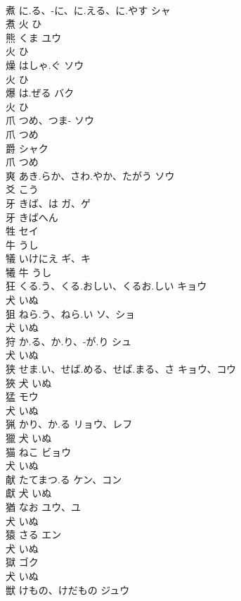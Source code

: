 \documentclass[8pt]{extreport}
\begin{document}
\begin{CJK}{UTF8}{min}
\\	煮	に.る、-に、に.える、に.やす	シャ	
\\	煮	火		ひ		
\\	熊	くま	ユウ	
\\	火		ひ		
\\	燥	はしゃ.ぐ	ソウ	
\\	火		ひ		
\\	爆	は.ぜる	バク	
\\	火		ひ		
\\	爪	つめ、つま-	ソウ	
\\	爪		つめ		
\\	爵		シャク	
\\	爪		つめ		
\\	爽	あき.らか、さわ.やか、たがう	ソウ	
\\	爻		こう		
\\	牙	きば、は	ガ、ゲ	
\\	牙		きばへん		
\\	牲		セイ	
\\	牛		うし		
\\	犠	いけにえ	ギ、キ	
\\	犧	牛		うし		
\\	狂	くる.う、くる.おしい、くるお.しい	キョウ	
\\	犬		いぬ		
\\	狙	ねら.う、ねら.い	ソ、ショ	
\\	犬		いぬ		
\\	狩	か.る、か.り、-が.り	シュ	
\\	犬		いぬ		
\\	狭	せま.い、せば.める、せば.まる、さ	キョウ、コウ	
\\	狹	犬		いぬ		
\\	猛		モウ	
\\	犬		いぬ		
\\	猟	かり、か.る	リョウ、レフ	
\\	獵	犬		いぬ		
\\	猫	ねこ	ビョウ	
\\	犬		いぬ		
\\	献	たてまつ.る	ケン、コン	
\\	獻	犬		いぬ		
\\	猶	なお	ユウ、ユ	
\\	犬		いぬ		
\\	猿	さる	エン	
\\	犬		いぬ		
\\	獄		ゴク	
\\	犬		いぬ		
\\	獣	けもの、けだもの	ジュウ	

\end{CJK}
\end{document}
